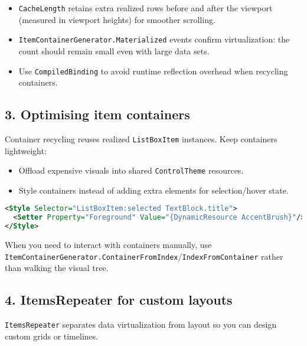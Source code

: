 \begin{itemize}
\tightlist
\item
  \passthrough{\lstinline!CacheLength!} retains extra realized rows
  before and after the viewport (measured in viewport heights) for
  smoother scrolling.
\item
  \passthrough{\lstinline!ItemContainerGenerator.Materialized!} events
  confirm virtualization: the count should remain small even with large
  data sets.
\item
  Use \passthrough{\lstinline!CompiledBinding!} to avoid runtime
  reflection overhead when recycling containers.
\end{itemize}

\subsection{3. Optimising item
containers}\label{optimising-item-containers}

Container recycling reuses realized
\passthrough{\lstinline!ListBoxItem!} instances. Keep containers
lightweight:

\begin{itemize}
\tightlist
\item
  Offload expensive visuals into shared
  \passthrough{\lstinline!ControlTheme!} resources.
\item
  Style containers instead of adding extra elements for selection/hover
  state.
\end{itemize}

\begin{lstlisting}[language=XML]
<Style Selector="ListBoxItem:selected TextBlock.title">
  <Setter Property="Foreground" Value="{DynamicResource AccentBrush}"/>
</Style>
\end{lstlisting}

When you need to interact with containers manually, use
\passthrough{\lstinline!ItemContainerGenerator.ContainerFromIndex!}/\passthrough{\lstinline!IndexFromContainer!}
rather than walking the visual tree.

\subsection{4. ItemsRepeater for custom
layouts}\label{itemsrepeater-for-custom-layouts}

\passthrough{\lstinline!ItemsRepeater!} separates data virtualization
from layout so you can design custom grids or timelines.

